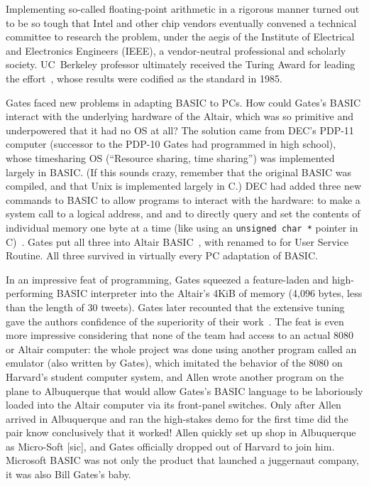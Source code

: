   \begin{tangent}
  Implementing so-called
  floating-point arithmetic in a rigorous manner turned out to be so tough that Intel 
  and other chip vendors eventually convened a technical committee to
  research the problem, under the aegis of the Institute of Electrical and 
  Electronics Engineers (IEEE), a vendor-neutral professional and scholarly
  society. 
  UC~Berkeley professor 
  ultimately received the 
  Turing Award for
  leading the effort~\cite{kahan_interview}, whose results were codified as
  the  standard in 1985.
  \end{tangent}

  \begin{tangent}

Gates faced new problems in adapting BASIC to PCs.
How could Gates's BASIC interact with the underlying hardware of the
Altair, which was so primitive and underpowered that it had no OS at all?
The solution came from 
DEC's PDP-11 computer (successor to the PDP-10 Gates had
programmed in high school), whose
timesharing OS  (``Resource sharing, time
sharing'') was implemented largely in BASIC.  (If this sounds crazy,
remember that the original BASIC was compiled, and that 
   Unix is implemented largely in C.)  DEC had added
three new commands to BASIC to allow programs to interact with the 
hardware:  to make a system call to a logical address,
and  and  to directly query and set the contents of individual memory
one byte at a time (like using an \texttt{unsigned char~*}
pointer in C)~\cite[pp.~204--205]{ceruzzi}.
Gates put all three into Altair BASIC~\cite{smithsonian_interview},
with  renamed to  for User Service Routine.  All three
survived in virtually every PC adaptation of BASIC.
  \end{tangent}

In an impressive feat of programming, Gates squeezed a feature-laden
and high-performing BASIC interpreter into the Altair's 4KiB of memory
(4,096 bytes, less than the length of 30 tweets).
Gates later recounted that the extensive tuning gave the authors
confidence of the superiority of their
work~\cite{programmers_at_work}.
The feat is even more impressive considering that none of the team had
access to an actual 8080 or Altair computer: the whole project was
done using another program called an emulator (also written by Gates),
which imitated the behavior of the 8080 on Harvard's student computer
system, and Allen wrote another program on the plane to Albuquerque
that would allow Gates's BASIC language to be laboriously loaded into
the Altair computer via its front-panel switches.
Only after Allen arrived in Albuquerque and ran the high-stakes demo
for the first time did the pair know conclusively that it worked!
Allen quickly set up shop in Albuquerque as Micro-Soft [sic], and
Gates officially dropped out of Harvard to join him.
Microsoft BASIC was not only the product that launched a juggernaut
company, it was also Bill Gates's baby.

